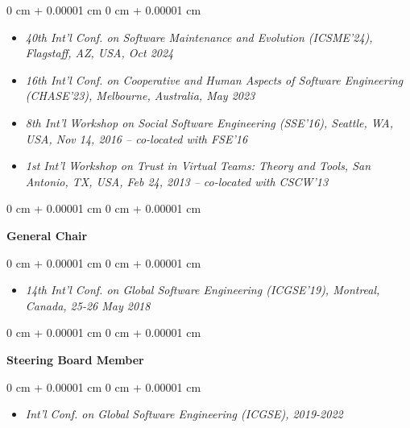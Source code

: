 \documentclass[10pt, a4paper]{article}
\newenvironment{highlights}{
    \begin{itemize}[
        topsep=0.10 cm,
        parsep=0.10 cm,
        partopsep=0pt,
        itemsep=0pt,
        leftmargin=0 cm + 10pt
    ]
}{
    \end{itemize}
} %
\newenvironment{onecolentry}{
    \begin{adjustwidth}{
        0 cm + 0.00001 cm
    }{
        0 cm + 0.00001 cm
    }
}{
    \end{adjustwidth}
} %
\begin{document}
        \vspace{0.10 cm}
        \begin{onecolentry}
            \begin{highlights}
                \item \textit{40th Int’l Conf. on Software Maintenance and Evolution (ICSME’24), Flagstaff, AZ, USA, Oct 2024}
                \item \textit{16th Int’l Conf. on Cooperative and Human Aspects of Software Engineering (CHASE’23), Melbourne, Australia, May 2023}
                \item \textit{8th Int’l Workshop on Social Software Engineering (SSE’16), Seattle, WA, USA, Nov 14, 2016 – co-located with FSE'16}
                \item \textit{1st Int’l Workshop on Trust in Virtual Teams: Theory and Tools, San Antonio, TX, USA, Feb 24, 2013 – co-located with CSCW'13}
            \end{highlights}
        \end{onecolentry}


        \vspace{0.2 cm}

        \begin{onecolentry}
            \textbf{General Chair}\end{onecolentry}

        \vspace{0.10 cm}
        \begin{onecolentry}
            \begin{highlights}
                \item \textit{14th Int'l Conf. on Global Software Engineering (ICGSE'19), Montreal, Canada, 25-26 May 2018}
            \end{highlights}
        \end{onecolentry}


        \vspace{0.2 cm}

        \begin{onecolentry}
            \textbf{Steering Board Member}\end{onecolentry}

        \vspace{0.10 cm}
        \begin{onecolentry}
            \begin{highlights}
                \item \textit{Int'l Conf. on Global Software Engineering (ICGSE), 2019-2022}
            \end{highlights}
        \end{onecolentry}
\end{document}
